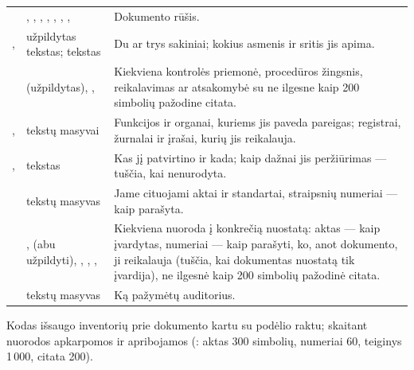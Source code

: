 \par\nopagebreak
\begin{xltabular}{\textwidth}{@{}L{34mm}L{40mm}Y@{}}
\toprule
{} &  &  \\
\midrule
\endhead
\bottomrule
\endlastfoot
{} & , , , , , , ,  & Dokumento rūšis. \\
,  & užpildytas tekstas; tekstas & Du ar trys sakiniai; kokius asmenis ir sritis jis apima. \\
 &  (užpildytas), ,  & Kiekviena kontrolės priemonė, procedūros žingsnis, reikalavimas ar atsakomybė su ne ilgesne kaip 200 simbolių pažodine citata. \\
,  & tekstų masyvai & Funkcijos ir organai, kuriems jis paveda pareigas; registrai, žurnalai ir įrašai, kurių jis reikalauja. \\
,  & tekstas & Kas jį patvirtino ir kada; kaip dažnai jis peržiūrimas --- tuščia, kai nenurodyta. \\
 & tekstų masyvas & Jame cituojami aktai ir standartai, straipsnių numeriai --- kaip parašyta. \\
 & ,  (abu užpildyti), , , ,  & Kiekviena nuoroda į konkrečią nuostatą: aktas --- kaip įvardytas, numeriai --- kaip parašyti, ko, anot dokumento, ji reikalauja (tuščia, kai dokumentas nuostatą tik įvardija), ne ilgesnė kaip 200 simbolių pažodinė citata. \\
 & tekstų masyvas & Ką pažymėtų auditorius. \\
\end{xltabular}

Kodas išsaugo inventorių prie dokumento kartu su podėlio raktu; skaitant nuorodos apkarpomos ir
apribojamos (: aktas 300 simbolių, numeriai 60, teiginys 1\,000, citata
200).

